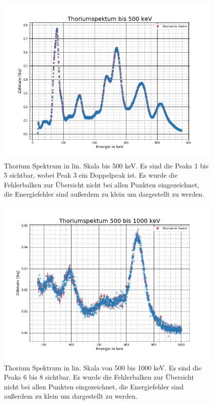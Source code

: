 \begin{figure}[h]
	\centering
	\includegraphics[scale=0.7]{Bilder/Th_1}
	\caption[Thorium Spektrum bis 500 keV]{\small Thorium Spektrum in lin. Skala bis 500 keV. Es sind die Peaks 1 bis 5 sichtbar, wobei Peak 3 ein Doppelpeak ist. Es wurde die Fehlerbalken zur Übersicht nicht bei allen Punkten eingezeichnet, die Energiefehler sind außerdem zu klein um dargestellt zu werden.}
	\label{th_500}
\end{figure}

\begin{figure}[h]
	\centering
	\includegraphics[scale=0.7]{Bilder/Th_2}
	\caption[Thorium Spektrum 500 bis 1000 keV]{\small Thorium Spektrum in lin. Skala von 500 bis 1000 keV. Es sind die Peaks 6 bis 8 sichtbar.
	Es wurde die Fehlerbalken zur Übersicht nicht bei allen Punkten eingezeichnet, die Energiefehler sind außerdem zu klein um dargestellt zu werden.}
	\label{th_1000}
\end{figure}
 \FloatBarrier
